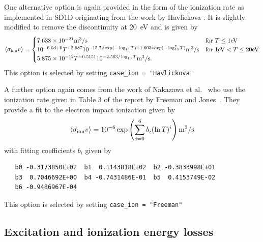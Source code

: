 \documentclass[amsmath,amssymb,a4]{revtex4-2}
\begin{document}
One alternative option is again provided in the form of the ionization rate as implemented in SD1D originating from the work by Havlickova \cite{havlickova2013}. It is slightly modified to remove the discontinuity at 20~eV and is given by \cite{SD1D}
\begin{equation}\label{ionization_SD1D}
    \langle\sigma_{\rm ion} v\rangle = \begin{cases} 7.638 \times 10^{-21} {\rm m}^3/{\rm s}             & \mbox{for } T \le 1 {\rm eV} \\
                                        10^{-6.0d+0} T^{-2.987} 10^{-15.72 \exp(-\log_{10}T) + 1.603*exp(-\log_{10}^2T)} {\rm m}^3/{\rm s} & \mbox{for } 1 {\rm eV} < T \le 20 {\rm eV} \\
                                        5.875 \times 10^{-12} T^{-0.5151} 10^{-2.563/\log_{10}T} {\rm m}^3/{\rm s}. \end{cases}
\end{equation}
This option is selected by setting {\tt case\_ion = "Havlickova"}

A further option again comes from the work of Nakazawa et al.~\cite{nakazawa2000} who use the ionization rate given in Table 3 of the report by Freeman and Jones~\cite{freeman1974}. They provide a fit to the electron impact ionization given by
\begin{equation}\label{ionization_FJ}
    \langle\sigma_{\rm ion} v\rangle = 10^{-6} \exp\left( \sum_{i=0}^6 b_i (\ln T)^i \right)  {\rm m}^3/{\rm s}
\end{equation}
with fitting coefficients $b_i$ given by
\begin{small}\begin{verbatim}
   b0 -0.3173850E+02  b1  0.1143818E+02  b2 -0.3833998E+01
   b3  0.7046692E+00  b4 -0.7431486E-01  b5  0.4153749E-02
   b6 -0.9486967E-04
\end{verbatim}\end{small}
This option is selected by setting {\tt case\_ion = "Freeman"}


\subsection{Excitation and ionization energy losses}
\end{document}
